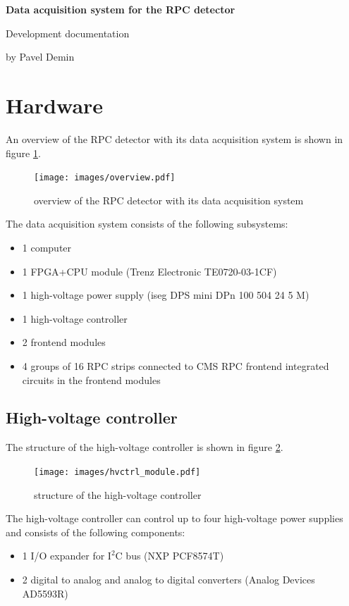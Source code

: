 \documentclass[12pt, a4paper]{article}
\begin{document}
\begin{flushright}
\bfseries\upshape\Large
Data acquisition system for the RPC detector

Development documentation

by Pavel Demin
\end{flushright}

\tableofcontents

\section{Hardware}

An overview of the RPC detector with its data acquisition system is shown in figure \ref{fig:overview}.

\begin{figure}[h!]
  \centering
  \texttt{[image: images/overview.pdf]}
  \caption{overview of the RPC detector with its data acquisition system}
  \label{fig:overview}
\end{figure}

The data acquisition system consists of the following subsystems:
\begin{itemize}[nosep]
  \item 1 computer
  \item 1 FPGA+CPU module (Trenz Electronic TE0720-03-1CF) \cite{te0720}
  \item 1 high-voltage power supply (iseg DPS mini DPn 100 504 24 5 M) \cite{dps}
  \item 1 high-voltage controller
  \item 2 frontend modules \cite{rpcfesch}
  \item 4 groups of 16 RPC strips connected to CMS RPC frontend integrated circuits \cite{rpcnim2000} in the frontend modules
\end{itemize}

\subsection{High-voltage controller}

The structure of the high-voltage controller is shown in figure \ref{fig:hvctrl_module}.

\begin{figure}[h!]
  \centering
  \texttt{[image: images/hvctrl\_module.pdf]}
  \caption{structure of the high-voltage controller}
  \label{fig:hvctrl_module}
\end{figure}

The high-voltage controller can control up to four high-voltage power supplies and consists of the following components:
\begin{itemize}[nosep]
  \item 1 I/O expander for $\text{I}^\text{2}\text{C}$ bus (NXP PCF8574T) \cite{pcf8574t}
  \item 2 digital to analog and analog to digital converters (Analog Devices AD5593R) \cite{ad5593r}
\end{itemize}
\end{document}
